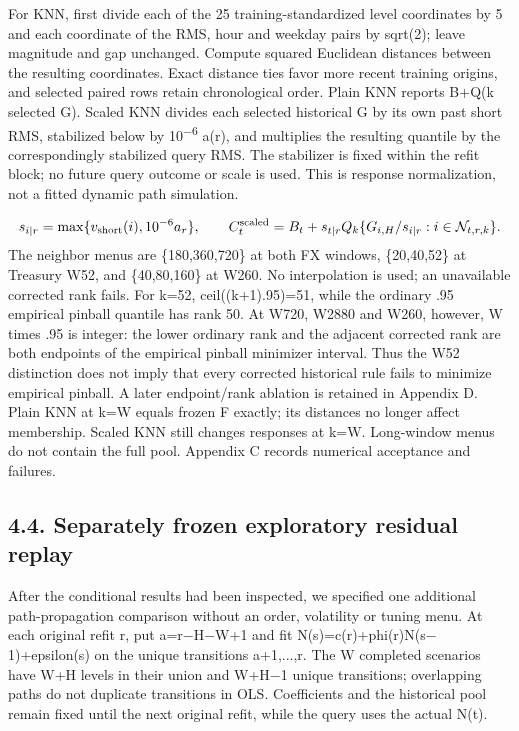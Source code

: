 \documentclass[10pt,a4paper]{article}
\begin{document}
For KNN, first divide each of the 25 training-standardized level coordinates by 5 and each coordinate of the RMS, hour and weekday pairs by sqrt(2); leave magnitude and gap unchanged. Compute squared Euclidean distances between the resulting coordinates. Exact distance ties favor more recent training origins, and selected paired rows retain chronological order. Plain KNN reports B+Q(k selected G). Scaled KNN divides each selected historical G by its own past short RMS, stabilized below by 10\textsuperscript{\(-\)6} a(r), and multiplies the resulting quantile by the correspondingly stabilized query RMS. The stabilizer is fixed within the refit block; no future query outcome or scale is used. This is response normalization, not a fitted dynamic path simulation.

\[
s_{i\mid r}=\max\{v_{\rm short}(i),10^{-6}a_r\},\qquad C_t^{\rm scaled}=B_t+s_{t\mid r}Q_k\{G_{i,H}/s_{i\mid r}:i\in\mathcal N_{t,r,k}\}.
\]
The neighbor menus are \{180,360,720\} at both FX windows, \{20,40,52\} at Treasury W52, and \{40,80,160\} at W260. No interpolation is used; an unavailable corrected rank fails. For k=52, ceil((k+1).95)=51, while the ordinary .95 empirical pinball quantile has rank 50. At W720, W2880 and W260, however, W times .95 is integer: the lower ordinary rank and the adjacent corrected rank are both endpoints of the empirical pinball minimizer interval. Thus the W52 distinction does not imply that every corrected historical rule fails to minimize empirical pinball. A later endpoint/rank ablation is retained in Appendix D. Plain KNN at k=W equals frozen F exactly; its distances no longer affect membership. Scaled KNN still changes responses at k=W. Long-window menus do not contain the full pool. Appendix C records numerical acceptance and failures.

\subsection*{4.4. Separately frozen exploratory residual replay}
After the conditional results had been inspected, we specified one additional path-propagation comparison without an order, volatility or tuning menu. At each original refit r, put a=r\(-\)H\(-\)W+1 and fit N(s)=c(r)+phi(r)N(s\(-\)1)+epsilon(s) on the unique transitions a+1,...,r. The W completed scenarios have W+H levels in their union and W+H\(-\)1 unique transitions; overlapping paths do not duplicate transitions in OLS. Coefficients and the historical pool remain fixed until the next original refit, while the query uses the actual N(t).
\end{document}
